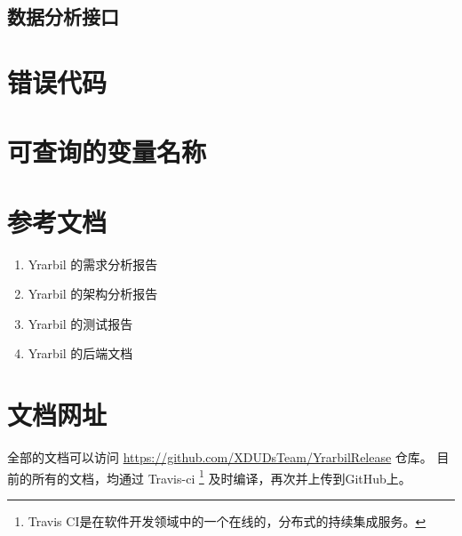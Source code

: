 \documentclass[UTF8]{article}
\begin{document}
        \subsection{数据分析接口}

		\section{错误代码}

		\section{可查询的变量名称}



    \newpage
    \begin{appendices}
    \section{参考文档}
    \begin{enumerate}
        \item Yrarbil 的需求分析报告
        \item Yrarbil 的架构分析报告
        \item Yrarbil 的测试报告
        \item Yrarbil 的后端文档
    \end{enumerate}
    \section{文档网址}
         全部的文档可以访问 \url{https://github.com/XDUDsTeam/YrarbilRelease} 仓库。
      目前的所有的文档，均通过 Travis-ci
      \footnote{Travis CI是在软件开发领域中的一个在线的，分布式的持续集成服务。}
      及时编译，再次并上传到GitHub上。

    \end{appendices}
\end{document}
